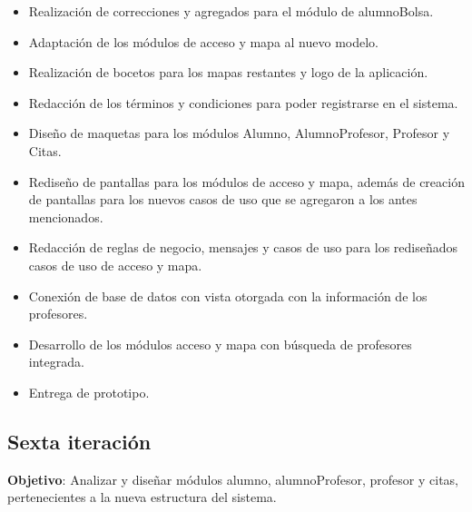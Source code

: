 \begin{itemize}
	\item Realización de correcciones y agregados para el módulo de alumnoBolsa.
	\item Adaptación de los módulos de acceso y mapa al nuevo modelo.
	\item Realización de bocetos para los mapas restantes y logo de la aplicación.
	\item Redacción de los términos y condiciones para poder registrarse en el sistema.
	\item Diseño de maquetas para los módulos Alumno, AlumnoProfesor, Profesor y Citas.
	\item Rediseño de pantallas para los módulos de acceso y mapa, además de creación de pantallas para los nuevos casos de uso que se agregaron a los antes mencionados.
	\item Redacción de reglas de negocio, mensajes y casos de uso para los rediseñados casos de uso de acceso y mapa.
	\item Conexión de base de datos con vista otorgada con la información de los profesores.
	\item Desarrollo de los módulos acceso y mapa con búsqueda de profesores integrada.
	\item Entrega de prototipo.
\end{itemize}


\subsection{Sexta iteración}

\noindent
\textbf{Objetivo}: Analizar y diseñar módulos alumno, alumnoProfesor, profesor y citas, pertenecientes a la nueva estructura del sistema.
\newline

